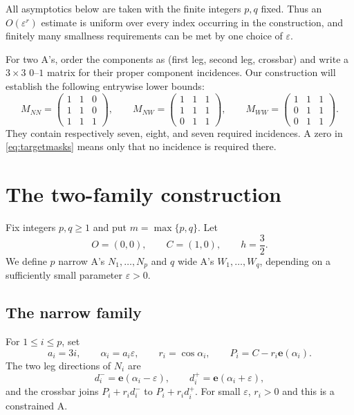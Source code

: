 \documentclass[11pt]{amsart}
\theoremstyle{definition}
\newcommand{\evec}{\mathbf e}
\newcommand{\eps}{\varepsilon}
\begin{document}
All asymptotics below are taken with the finite integers $p,q$ fixed.  Thus
an $O(\eps^r)$ estimate is uniform over every index occurring in the
construction, and finitely many smallness requirements can be met by one
choice of $\eps$.

For two A's, order the components as (first leg, second leg, crossbar) and
write a $3\times3$ $0$--$1$ matrix for their proper component incidences.
Our construction will establish the following entrywise lower bounds:
\begin{equation}\label{eq:targetmasks}
 M_{NN}=\begin{pmatrix}1&1&0\\1&1&0\\1&1&1\end{pmatrix},\qquad
 M_{NW}=\begin{pmatrix}1&1&1\\1&1&1\\0&1&1\end{pmatrix},\qquad
 M_{WW}=\begin{pmatrix}1&1&1\\0&1&1\\0&1&1\end{pmatrix}.
\end{equation}
They contain respectively seven, eight, and seven required incidences.  A
zero in \eqref{eq:targetmasks} means only that no incidence is required
there.

\section{The two-family construction}

Fix integers $p,q\ge1$ and put $m=\max\{p,q\}$.  Let
\[
 O=(0,0),\qquad C=(1,0),\qquad h=\frac32.
\]
We define $p$ narrow A's $N_1,\ldots,N_p$ and $q$ wide A's
$W_1,\ldots,W_q$, depending on a sufficiently small parameter $\eps>0$.

\subsection{The narrow family}

For $1\le i\le p$, set
\[
 a_i=3i,
 \qquad \alpha_i=a_i\eps,
 \qquad r_i=\cos\alpha_i,
 \qquad P_i=C-r_i\evec(\alpha_i).
\]
The two leg directions of $N_i$ are
\[
 d_i^- =\evec(\alpha_i-\eps),
 \qquad
 d_i^+ =\evec(\alpha_i+\eps),
\]
and the crossbar joins $P_i+r_i d_i^-$ to $P_i+r_i d_i^+$.
For small $\eps$, $r_i>0$ and this is a constrained A.
\end{document}
